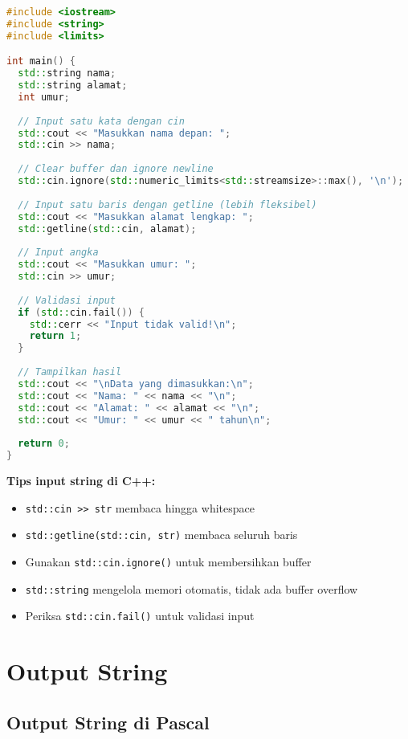 \documentclass[../main.tex]{subfiles}
\begin{document}
\begin{lstlisting}[language=C++, caption={Input string di C++}]
#include <iostream>
#include <string>
#include <limits>

int main() {
  std::string nama;
  std::string alamat;
  int umur;
  
  // Input satu kata dengan cin
  std::cout << "Masukkan nama depan: ";
  std::cin >> nama;
  
  // Clear buffer dan ignore newline
  std::cin.ignore(std::numeric_limits<std::streamsize>::max(), '\n');
  
  // Input satu baris dengan getline (lebih fleksibel)
  std::cout << "Masukkan alamat lengkap: ";
  std::getline(std::cin, alamat);
  
  // Input angka
  std::cout << "Masukkan umur: ";
  std::cin >> umur;
  
  // Validasi input
  if (std::cin.fail()) {
    std::cerr << "Input tidak valid!\n";
    return 1;
  }
  
  // Tampilkan hasil
  std::cout << "\nData yang dimasukkan:\n";
  std::cout << "Nama: " << nama << "\n";
  std::cout << "Alamat: " << alamat << "\n";
  std::cout << "Umur: " << umur << " tahun\n";
  
  return 0;
}
\end{lstlisting}

\textbf{Tips input string di C++:}
\begin{itemize}
  \item \texttt{std::cin >> str} membaca hingga whitespace
  \item \texttt{std::getline(std::cin, str)} membaca seluruh baris
  \item Gunakan \texttt{std::cin.ignore()} untuk membersihkan buffer
  \item \texttt{std::string} mengelola memori otomatis, tidak ada buffer overflow
  \item Periksa \texttt{std::cin.fail()} untuk validasi input
\end{itemize}

\section{Output String}

\subsection{Output String di Pascal}
\end{document}
